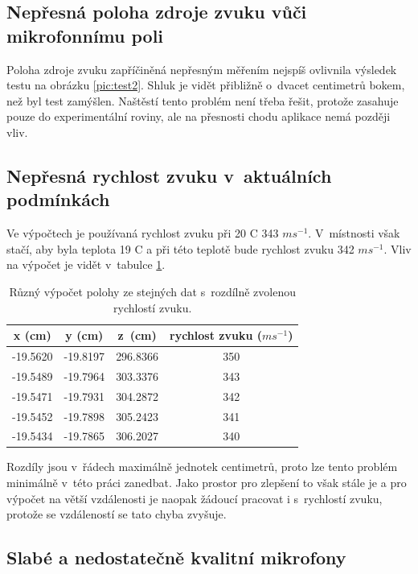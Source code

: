 \subsection{Nepřesná poloha zdroje zvuku vůči mikrofonnímu poli}

Poloha zdroje zvuku zapříčiněná nepřesným měřením nejspíš ovlivnila výsledek testu na obrázku \ref{pic:test2}. Shluk je vidět přibližně o~dvacet centimetrů bokem, než byl test zamýšlen.
Naštěstí tento problém není třeba řešit, protože zasahuje pouze do experimentální roviny, ale na přesnosti chodu aplikace nemá později vliv.

\subsection{Nepřesná rychlost zvuku v~aktuálních podmínkách}

Ve výpočtech je používaná rychlost zvuku při 20 \degree C 343 $ms^{-1}$. V~místnosti však stačí, aby byla teplota 19 \degree C a při této teplotě bude rychlost zvuku 342 $ms^{-1}$. Vliv na výpočet je vidět v~tabulce \ref{tabulka3}.

\begin{table}[!h]
    \centering
    \begin{tabular}{||c | c | c | c||} 
 \hline
 x (cm) & y (cm) & z~(cm) & rychlost zvuku ($ms^{-1}$) \\ [0.5ex] 
 \hline\hline
 -19.5620 & -19.8197 & 296.8366 & 350 \\ 
 \hline
 -19.5489 & -19.7964 & 303.3376 & 343 \\
 \hline
 -19.5471 & -19.7931 & 304.2872 & 342 \\
 \hline
 -19.5452 & -19.7898 & 305.2423 & 341 \\
 \hline
 -19.5434 & -19.7865 & 306.2027 & 340 \\ [1ex] 
 \hline
    \end{tabular}
    \caption{Různý výpočet polohy ze stejných dat s~rozdílně zvolenou rychlostí zvuku.}
    \label{tabulka3}
\end{table}


Rozdíly jsou v~řádech maximálně jednotek centimetrů, proto lze tento problém minimálně v~této práci zanedbat. Jako prostor pro zlepšení to však stále je a pro výpočet na větší vzdálenosti je naopak žádoucí pracovat i s~rychlostí zvuku, protože se vzdáleností se tato chyba zvyšuje.

\subsection{Slabé a nedostatečně kvalitní mikrofony}

